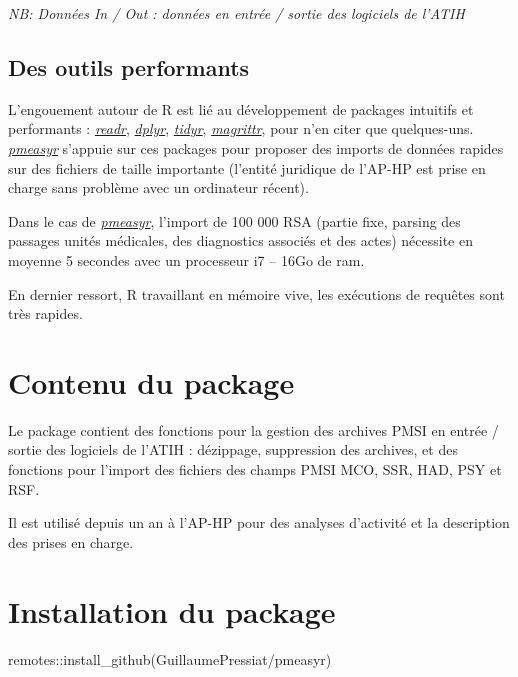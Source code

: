\documentclass[
]{book}
\newenvironment{Shaded}{\begin{snugshade}}{\end{snugshade}}
\newcommand{\FunctionTok}[1]{\textcolor[rgb]{0.00,0.00,0.00}{#1}}
\newcommand{\NormalTok}[1]{#1}
\newcommand{\SpecialCharTok}[1]{\textcolor[rgb]{0.00,0.00,0.00}{#1}}
\newcommand{\StringTok}[1]{\textcolor[rgb]{0.31,0.60,0.02}{#1}}
\begin{document}
\emph{NB: Données In / Out : données en entrée / sortie des logiciels de l'ATIH}

\hypertarget{des-outils-performants}{%
\subsection{Des outils performants}\label{des-outils-performants}}

L'engouement autour de R est lié au développement de packages intuitifs et performants : \href{http://readr.tidyverse.org}{\emph{readr}}, \href{https://github.com/hadley/dplyr}{\emph{dplyr}}, \href{http://tidyr.tidyverse.org}{\emph{tidyr}}, \href{https://github.com/tidyverse/magrittr}{\emph{magrittr}}, pour n'en citer que quelques-uns. \href{https://github.com/GuillaumePressiat/pmeasyr}{\emph{pmeasyr}} s'appuie sur ces packages pour proposer des imports de données rapides sur des fichiers de taille importante (l'entité juridique de l'AP-HP est prise en charge sans problème avec un ordinateur récent).

Dans le cas de \href{https://github.com/GuillaumePressiat/pmeasyr}{\emph{pmeasyr}}, l'import de 100 000 RSA (partie fixe, parsing des passages unités médicales, des diagnostics associés et des actes) nécessite en moyenne 5 secondes avec un processeur i7 -- 16Go de ram.

En dernier ressort, R travaillant en mémoire vive, les exécutions de requêtes sont très rapides.

\hypertarget{contenu-du-package}{%
\section{Contenu du package}\label{contenu-du-package}}

Le package contient des fonctions pour la gestion des archives PMSI en entrée / sortie des logiciels de l'ATIH : dézippage, suppression des archives, et des fonctions pour l'import des fichiers des champs PMSI MCO, SSR, HAD, PSY et RSF.

Il est utilisé depuis un an à l'AP-HP pour des analyses d'activité et la description des prises en charge.

\hypertarget{installation-du-package}{%
\section{Installation du package}\label{installation-du-package}}

\begin{Shaded}
\begin{Highlighting}[]
\NormalTok{remotes}\SpecialCharTok{::}\FunctionTok{install\_github}\NormalTok{(}\StringTok{\textquotesingle{}GuillaumePressiat/pmeasyr\textquotesingle{}}\NormalTok{)}
\end{Highlighting}
\end{Shaded}
\end{document}

